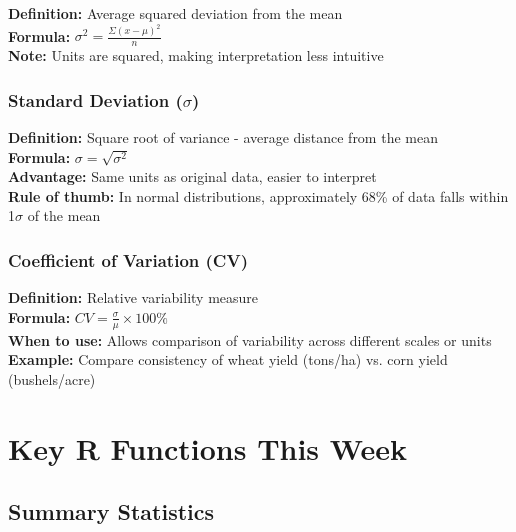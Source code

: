 \documentclass[11pt,a4paper]{article}
\begin{document}
\begin{formulabox}
\textbf{Definition:} Average squared deviation from the mean\\[0.3cm]
\textbf{Formula:} $\sigma^2 = \frac{\Sigma(x - \mu)^2}{n}$\\[0.3cm]
\textbf{Note:} Units are squared, making interpretation less intuitive
\end{formulabox}

\subsubsection{\texorpdfstring{Standard Deviation ($\sigma$)}{Standard Deviation (sigma)}}

\begin{formulabox}
\textbf{Definition:} Square root of variance - average distance from the mean\\[0.3cm]
\textbf{Formula:} $\sigma = \sqrt{\sigma^2}$\\[0.3cm]
\textbf{Advantage:} Same units as original data, easier to interpret\\
\textbf{Rule of thumb:} In normal distributions, approximately 68\% of data falls within 1$\sigma$ of the mean
\end{formulabox}

\subsubsection{Coefficient of Variation (CV)}

\begin{formulabox}
\textbf{Definition:} Relative variability measure\\[0.3cm]
\textbf{Formula:} $CV = \frac{\sigma}{\mu} \times 100\%$\\[0.3cm]
\textbf{When to use:} Allows comparison of variability across different scales or units\\
\textbf{Example:} Compare consistency of wheat yield (tons/ha) vs. corn yield (bushels/acre)
\end{formulabox}

\section{Key R Functions This Week}

\subsection{Summary Statistics}
\end{document}
